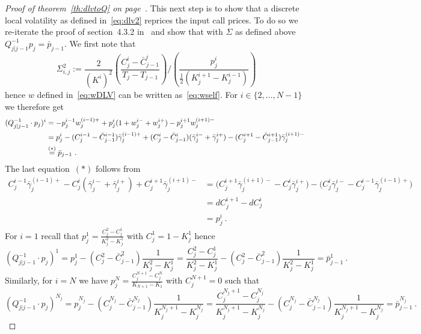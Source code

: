 \documentclass[twoside]{article}
\theoremstyle{plain}
\theoremstyle{definition}
\theoremstyle{remark}
\DeclareRobustCommand{\supstack}[2]{\stackrel{\mbox{{\scriptsize ${#1}$}}}{ {#2} }}     %
\begin{document}
\begin{proof}[Proof of theorem~\ref{th:dlvtoQ} on page~\pageref{th:dlvtoQ}]
This next step is to show that a discrete local volatility as defined in~\eqref{eq:dlv2}
reprices the input call prices. To do so
    we re-iterate the proof of section~4.3.2 in~\cite{DLV}
    and show that with $\Sigma$ as defined above $ Q_{j|j-1}^{-1} p_j = \bar p_{j-1}$. We first note that
    $$
        \Sigma^2_{i,j} := \frac{2}{(K^i)^2} \left( \frac{ C_j^i - \bar C_{j-1}^i }{ T_j - T_{j-1} } \right)/\left( \frac{ p^i_j}{ \frac12 (K^{i+1}_j-K_j^{i-1}) } \right)
    $$
    hence $w$ defined in~\eqref{eq:wDLV} can be written as~\eqref{eq:wself}.
    For $i\in\{2,\ldots,N-1\}$ we therefore get
    \begin{align*}
        ( Q_{j|j-1}^{-1}\cdot p_j  )^i
        & = 
            - p_j^{i-1}  w^{(i-1)+}_j
            +
            p_j^{i} (1 + w^{i-}_j + w^{i+}_j)
            -
             p_j^{i+1}  w^{(i+1)-}_j
       \\ & = 
            p^i_j
            - ( C_j^{i-1} - \bar C_{j-1}^{i-1} )  \bar \gamma^{(i-1)+}_j
            +
            ( C_j^{i} - \bar C_{j-1}^{i} ) (\bar \gamma^{i-}_j + \bar \gamma^{i+}_j)
            -
            ( C_j^{i+1} - \bar C_{j-1}^{i+1} ) \bar \gamma^{(i+1)-}_j
        \ 
        \\ & \supstack{(*)} =\bar   p_{j-1} \ .
    \end{align*}
    The last equation~$(*)$ follows from
    \begin{align*}
         C_{j}^{i-1}  \bar \gamma^{(i-1)+}_j
                     -
                      C_{j}^{i} (\bar \gamma^{i-}_j + \bar \gamma^{i+}_j)
                      +
                       C_{j}^{i+1} \bar \gamma^{(i+1)-}_j   
       & =
        \Big(  C_{j}^{i+1} \bar \gamma^{(i+1)-}_j  - C_{j}^{i}  \bar \gamma^{i+}_j \Big)
        - \Big( C_{j}^{i} \bar \gamma^{i-}_j  -  C_{j}^{i-1}  \bar \gamma^{(i-1)+}_j \Big)
       \\& =
       dC^{i+1}_j
        - dC^{i}_j \\&=  p^i_j \ .
    \end{align*}
    For $i=1$ recall that $p^1_j = \frac{ C^2_j-C^1_j }{ K^2_j - K^1_j }$ with $C^1_j=1-K_j^1$
    hence
   $$
            ( Q_{j|j-1}^{-1} \cdot p_j  )^1
            = p_j^1 - \left( C^2_j - \bar C^2_{j-1} \right)\frac1{ K^2_j-K^1_j } 
            = \frac{ C^2_j-C^1_j }{ K^2_j - K^1_j }- \left( C^2_j -\bar  C^2_{j-1} \right)\frac1{ K^2_j-K^1_j } = \bar p^1_{j-1} \ .
    $$
    Similarly, for $i=N$ we have $p^N_j = \frac{ C^{N+1}_j-C^N_j }{ K_{N+1} - K_1 }$
    with $C^{N+1}_j=0$ such that
    $$
        ( Q_{j|j-1}^{-1} \cdot p_j  )^{N_j}
        = p^{N_j}_j - ( C^{N_j}_j -\bar  C^{N_j}_{j-1} ) \frac1{ K^{N_j+1}_j - K^{N_j}_j }
        = \frac{ C^{{N_j}+1}_j-C^{N_j}_j }{ K^{{N_j}+1}_j - K^{N_j}_j } - ( C^{N_j}_j - \bar C^{N_j}_{j-1} ) \frac1{ K^{{N_j}+1}_j - K^{N_j}_j }
        = \bar p^{N_j}_{j-1} \ .
    $$
\end{proof}


   
   
\end{document}
